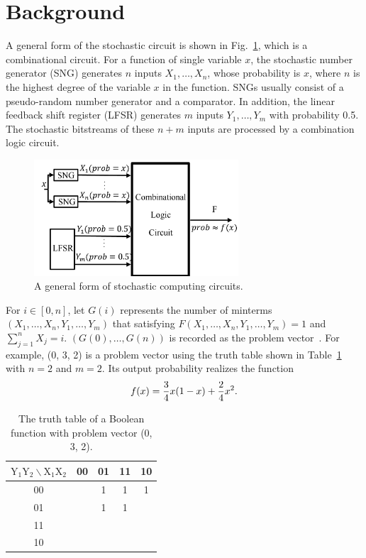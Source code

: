 \documentclass[conference,letterpaper]{IEEEtran}
\begin{document}
\section*{Background}
A general form of the stochastic circuit is shown in Fig.~\ref{fig2}, which is a combinational circuit. For a function of single variable $x$, the stochastic number generator (SNG) generates $n$ inputs $X_{1}, \ldots, X_{n}$, whose probability is $x$, where $n$ is the highest degree of the variable $x$ in the function. SNGs usually consist of a pseudo-random number generator and a comparator. In addition, the linear feedback shift register (LFSR) generates $m$ inputs $Y_{1}, \ldots, Y_{m}$ with probability 0.5. The stochastic bitstreams of these $n+m$ inputs are processed by a combination logic circuit.

\begin{figure}[t]
	\centering
	\includegraphics[width=3in]{fig/sc.pdf}	
	\caption{\label{fig2}A general form of stochastic computing circuits.} \vspace{-3ex}
\end{figure}

For $i\in[0,n]$, let $G(i)$ represents the number of minterms $(X_{1}, \ldots, X_{n}, Y_{1}, \ldots, Y_{m})$ that satisfying $F(X_{1}, \ldots, X_{n}, Y_{1}, \ldots, Y_{m})=1$ and $\sum_{j=1}^{n} X_{j}=i$. $(G(0), \ldots, G(n))$ is recorded as the problem vector~\cite{2}. For example, (0, 3, 2) is a problem vector using the truth table shown in Table~\ref{tab:tt} with $n=2$ and $m=2$. Its output probability realizes the function
\begin{equation}
f(x)=\frac{3}{4} x(1-x)+\frac{2}{4} x^{2}.\vspace{-2.5ex}
\end{equation}


\begin{table}[htbp]
\setlength{\abovecaptionskip}{0.cm}
\setlength{\belowcaptionskip}{0.pt}
\setlength{\tabcolsep}{1mm}
\caption{The truth table of a Boolean function with problem vector (0, 3, 2).}
\centering \label{tab:tt}
\begin{tabular}{|c|c|c|c|c|}
\hline $\mathrm{Y}_{1} \mathrm{Y}_{2} \backslash \mathrm{X}_{1} \mathrm{X}_{2}$ & 00 & 01 & 11 & 10 \\
\hline 00 & & 1 & 1 & 1 \\
\hline 01 & & 1 & 1 & \\
\hline 11 & & & & \\
\hline 10 & & & & \\
\hline
\end{tabular}
\end{table}
\end{document}

